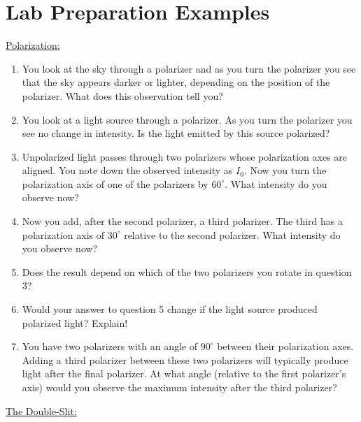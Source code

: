 \section{Lab Preparation Examples}
\underline{Polarization:}
\begin{enumerate}
\item You look at the sky through a polarizer and as you turn the polarizer you see that the sky appears darker or lighter, depending on the position of the polarizer. What does this observation tell you?

\item You look at a light source through a polarizer. As you turn the polarizer you see no change in intensity. Is the light emitted by this source polarized?

\item Unpolarized light passes through two polarizers whose polarization axes are aligned. You note down the observed intensity as $I_{0}$. Now you turn the polarization axis of one of the polarizers by $60^{\circ}$. What intensity do you observe now?

\item Now you add, after the second polarizer, a third polarizer. The third has a polarization axis of $30^{\circ}$ relative to the second polarizer. What intensity do you observe now?

\item Does the result depend on which of the two polarizers you rotate in question 3?

\item Would your answer to question 5 change if the light source produced polarized light? Explain!

\item You have two polarizers with an angle of $90^{\circ}$ between their polarization axes. Adding a third polarizer between these two polarizers will typically produce light after the final polarizer. At what angle (relative to the first polarizer's axis) would you observe the maximum intensity after the third polarizer?
\end{enumerate}

\underline{The Double-Slit:}

